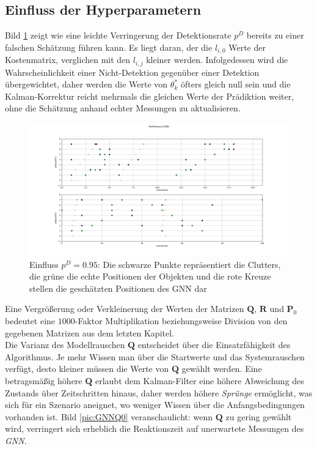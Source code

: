\documentclass[10pt,a4paper]{article}
\begin{document}
\subsection{Einfluss der Hyperparametern}\label{subsub: GNNParameter}
Bild \ref{pic:GNNPD} zeigt wie eine leichte Verringerung der Detektionsrate $p^D$ bereits zu einer falschen Schätzung führen kann. Es liegt daran, der die $l_{i,0}$ Werte der Kostenmatrix, verglichen mit den $l_{i,j}$ kleiner werden. Infolgedessen wird die Wahrscheinlichkeit einer Nicht-Detektion gegenüber einer Detektion übergewichtet, daher werden die Werte von $\theta^*_k$ öfters gleich null sein und die Kalman-Korrektur reicht mehrmals die gleichen Werte der Prädiktion weiter, ohne die Schätzung anhand echter Messungen zu aktualisieren. \\
\begin{figure}[h!]
\begin{center}
\includegraphics[width=13 cm]{./Pictures_report/GNNPD}
\caption{Einfluss $p^D = 0.95$: Die schwarze Punkte repräsentiert die Clutters, die grüne die echte Positionen der Objekten und die rote Kreuze stellen die geschätzten Positionen des GNN dar}
\label{pic:GNNPD}
\end{center}
\end{figure}
Eine Vergrößerung oder Verkleinerung der Werten der Matrizen $\textbf{Q}$, $\textbf{R}$ und $\textbf{P}_0$ bedeutet eine $1000$-Faktor Multiplikation beziehungsweise Division von den gegebenen Matrizen aus dem letzten Kapitel.\\
Die Varianz des Modellrauschen $\textbf{Q}$ entscheidet über die Einsatzfähigkeit des Algorithmus. Je mehr Wissen man über die Startwerte und das Systemrauschen verfügt, desto kleiner müssen die Werte von $\textbf{Q}$ gewählt werden. Eine betragsmäßig höhere $\textbf{Q}$ erlaubt dem Kalman-Filter eine höhere Abweichung des Zustands über Zeitschritten hinaus, daher werden höhere \textit{Sprünge} ermöglicht, was sich für ein Szenario aneignet, wo weniger Wissen über die Anfangsbedingungen vorhanden ist. Bild \ref{pic:GNNQ0} veranschaulicht: wenn $\textbf{Q}$ zu gering gewählt wird, verringert sich erheblich die Reaktionszeit auf unerwartete Messungen des \textit{GNN}.\\
\end{document}
